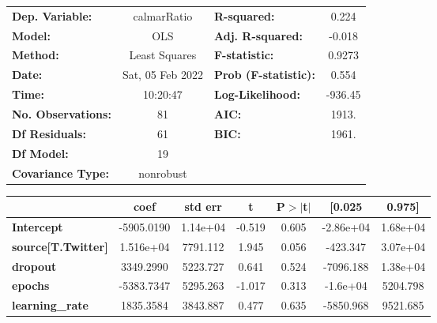 \begin{center}
\begin{tabular}{lclc}
\toprule
\textbf{Dep. Variable:}                   &   calmarRatio    & \textbf{  R-squared:         } &     0.224   \\
\textbf{Model:}                           &       OLS        & \textbf{  Adj. R-squared:    } &    -0.018   \\
\textbf{Method:}                          &  Least Squares   & \textbf{  F-statistic:       } &    0.9273   \\
\textbf{Date:}                            & Sat, 05 Feb 2022 & \textbf{  Prob (F-statistic):} &    0.554    \\
\textbf{Time:}                            &     10:20:47     & \textbf{  Log-Likelihood:    } &   -936.45   \\
\textbf{No. Observations:}                &          81      & \textbf{  AIC:               } &     1913.   \\
\textbf{Df Residuals:}                    &          61      & \textbf{  BIC:               } &     1961.   \\
\textbf{Df Model:}                        &          19      & \textbf{                     } &             \\
\textbf{Covariance Type:}                 &    nonrobust     & \textbf{                     } &             \\
\bottomrule
\end{tabular}
\begin{tabular}{lcccccc}
                                          & \textbf{coef} & \textbf{std err} & \textbf{t} & \textbf{P$> |$t$|$} & \textbf{[0.025} & \textbf{0.975]}  \\
\midrule
\textbf{Intercept}                        &   -5905.0190  &     1.14e+04     &    -0.519  &         0.605        &    -2.86e+04    &     1.68e+04     \\
\textbf{source[T.Twitter]}                &    1.516e+04  &     7791.112     &     1.945  &         0.056        &     -423.347    &     3.07e+04     \\
\textbf{dropout}                          &    3349.2990  &     5223.727     &     0.641  &         0.524        &    -7096.188    &     1.38e+04     \\
\textbf{epochs}                           &   -5383.7347  &     5295.263     &    -1.017  &         0.313        &     -1.6e+04    &     5204.798     \\
\textbf{learning\_rate}                   &    1835.3584  &     3843.887     &     0.477  &         0.635        &    -5850.968    &     9521.685     \\

\end{tabular}
\end{center}
